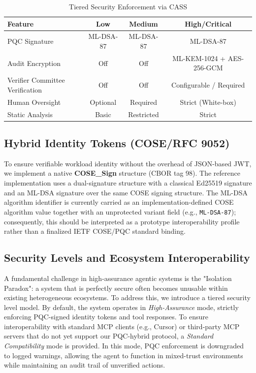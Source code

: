\documentclass[conference]{IEEEtran}
\begin{document}
\begin{table}[htbp]
\caption{Tiered Security Enforcement via CASS}
\centering
\begin{tabularx}{\columnwidth}{|l|C|C|C|}
\hline
\textbf{Feature} & \textbf{Low} & \textbf{Medium} & \textbf{High/Critical} \\
\hline
PQC Signature & ML-DSA-87 & ML-DSA-87 & ML-DSA-87 \\
Audit Encryption & Off & Off & ML-KEM-1024 + AES-256-GCM \\
Verifier Committee Verification & Off & Off & Configurable / Required \\
Human Oversight & Optional & Required & Strict (White-box) \\
Static Analysis & Basic & Restricted & Strict \\
\hline
\end{tabularx}
\label{tab:cass_matrix}
\end{table}

\subsection{Hybrid Identity Tokens (COSE/RFC 9052)}
To ensure verifiable workload identity without the overhead of JSON-based JWT, we implement a native \textbf{COSE\_Sign} structure (CBOR tag 98). The reference implementation uses a dual-signature structure with a classical Ed25519 signature and an ML-DSA signature over the same COSE signing structure. The ML-DSA algorithm identifier is currently carried as an implementation-defined COSE algorithm value together with an unprotected variant field (e.g., \texttt{ML-DSA-87}); consequently, this should be interpreted as a prototype interoperability profile rather than a finalized IETF COSE/PQC standard binding.

\subsection{Security Levels and Ecosystem Interoperability}
A fundamental challenge in high-assurance agentic systems is the "Isolation Paradox": a system that is perfectly secure often becomes unusable within existing heterogeneous ecosystems. To address this, we introduce a tiered security level model. By default, the system operates in \textit{High-Assurance} mode, strictly enforcing PQC-signed identity tokens and tool responses. To ensure interoperability with standard MCP clients (e.g., Cursor) or third-party MCP servers that do not yet support our PQC-hybrid protocol, a \textit{Standard Compatibility} mode is provided. In this mode, PQC enforcement is downgraded to logged warnings, allowing the agent to function in mixed-trust environments while maintaining an audit trail of unverified actions.
\end{document}

